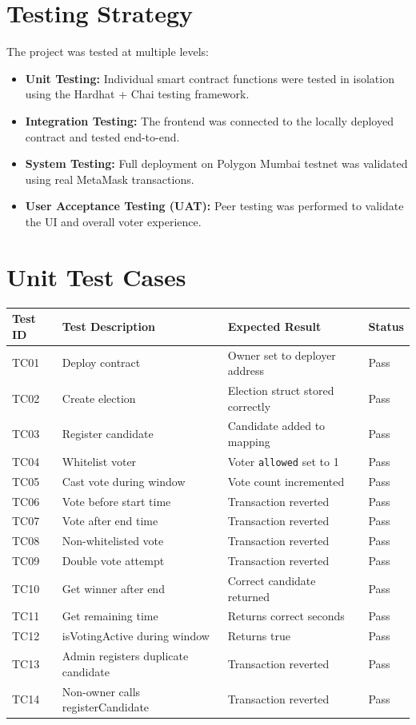 \documentclass[12pt,a4paper]{report}
\begin{document}
\section{Testing Strategy}

The project was tested at multiple levels:

\begin{itemize}
\item \textbf{Unit Testing:} Individual smart contract functions were tested in
      isolation using the Hardhat + Chai testing framework.
\item \textbf{Integration Testing:} The frontend was connected to the locally
      deployed contract and tested end-to-end.
\item \textbf{System Testing:} Full deployment on Polygon Mumbai testnet was
      validated using real MetaMask transactions.
\item \textbf{User Acceptance Testing (UAT):} Peer testing was performed to
      validate the UI and overall voter experience.
\end{itemize}

\section{Unit Test Cases}

\begin{longtable}{|l|l|l|l|}
\hline
\textbf{Test ID} & \textbf{Test Description} & \textbf{Expected Result} & \textbf{Status} \\
\hline
\endhead
TC01 & Deploy contract & Owner set to deployer address & Pass \\
TC02 & Create election & Election struct stored correctly & Pass \\
TC03 & Register candidate & Candidate added to mapping & Pass \\
TC04 & Whitelist voter & Voter \texttt{allowed} set to 1 & Pass \\
TC05 & Cast vote during window & Vote count incremented & Pass \\
TC06 & Vote before start time & Transaction reverted  & Pass \\
TC07 & Vote after end time & Transaction reverted & Pass \\
TC08 & Non-whitelisted vote & Transaction reverted & Pass \\
TC09 & Double vote attempt & Transaction reverted & Pass \\
TC10 & Get winner after end & Correct candidate returned & Pass \\
TC11 & Get remaining time & Returns correct seconds & Pass \\
TC12 & isVotingActive during window & Returns true & Pass \\
TC13 & Admin registers duplicate candidate & Transaction reverted & Pass \\
TC14 & Non-owner calls registerCandidate & Transaction reverted & Pass \\
\hline
\end{longtable}
\end{document}
